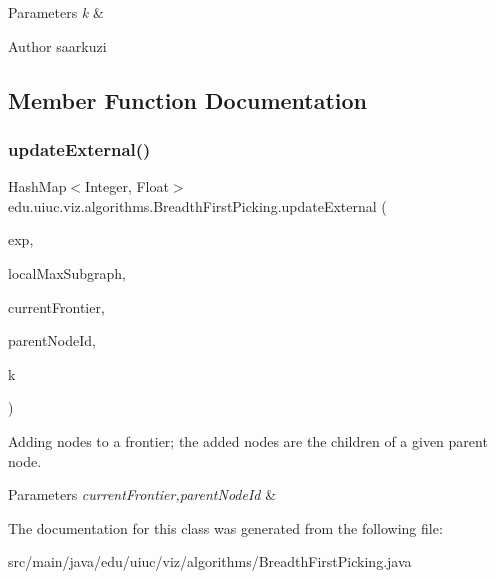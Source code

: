\begin{DoxyParams}{Parameters}
{\em k} & \\
\hline
\end{DoxyParams}
\begin{DoxyAuthor}{Author}
saarkuzi 
\end{DoxyAuthor}


\subsection{Member Function Documentation}
\mbox{\label{classedu_1_1uiuc_1_1viz_1_1algorithms_1_1_breadth_first_picking_ae66671d6e5c4f77f063bd1bdd7e08e89}} 
\subsubsection{\texorpdfstring{updateExternal()}{updateExternal()}}
{\footnotesize\ttfamily Hash\+Map$<$Integer, Float$>$ edu.\+uiuc.\+viz.\+algorithms.\+Breadth\+First\+Picking.\+update\+External (\begin{DoxyParamCaption}\item[{\mbox{\hyperlink{classedu_1_1uiuc_1_1viz_1_1algorithms_1_1_experiment}{Experiment}}}]{exp,  }\item[{Array\+List$<$ Integer $>$}]{local\+Max\+Subgraph,  }\item[{Hash\+Map$<$ Integer, Float $>$}]{current\+Frontier,  }\item[{Integer}]{parent\+Node\+Id,  }\item[{Integer}]{k }\end{DoxyParamCaption})\hspace{0.3cm}{\ttfamily [protected]}}

Adding nodes to a frontier; the added nodes are the children of a given parent node.


\begin{DoxyParams}{Parameters}
{\em current\+Frontier,parent\+Node\+Id} & \\
\hline
\end{DoxyParams}


The documentation for this class was generated from the following file\+:\begin{DoxyCompactItemize}
\item 
src/main/java/edu/uiuc/viz/algorithms/Breadth\+First\+Picking.\+java\end{DoxyCompactItemize}
